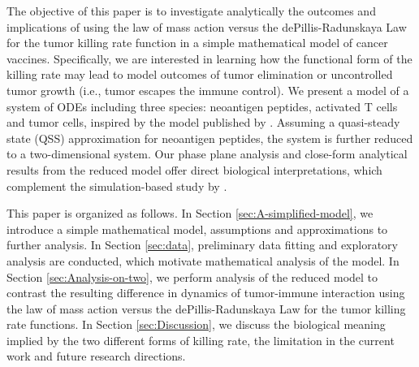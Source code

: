 \documentclass[review,authoryear]{elsarticle}
\begin{document}
The objective of this paper is to investigate analytically the outcomes
and implications of using the law of mass action versus the dePillis-Radunskaya
Law for the tumor killing rate function in a simple mathematical
model of cancer vaccines. Specifically, we are interested in learning
how the functional form of the killing rate may lead to model outcomes of tumor elimination
or uncontrolled tumor growth (i.e., tumor escapes the immune control). We present
a model of a system of ODEs including three species: neoantigen peptides, activated T cells and tumor cells, inspired by the model published by \citet{Messan2021}. Assuming a quasi-steady state (QSS) approximation for neoantigen peptides, the system is further reduced to a two-dimensional system. Our phase plane analysis and close-form analytical
results from the reduced model offer direct biological interpretations, which complement
the simulation-based study by \citet{Messan2021}.  

This paper is organized as follows. In Section \ref{sec:A-simplified-model},
we introduce a simple mathematical model, assumptions and approximations to further analysis. In Section \ref{sec:data}, preliminary data fitting and exploratory analysis are conducted, which motivate mathematical analysis of the model. In Section \ref{sec:Analysis-on-two},
we perform analysis of the reduced model to contrast the resulting
difference in dynamics of tumor-immune interaction using the law of mass action versus the dePillis-Radunskaya
Law for the tumor killing rate functions. In Section \ref{sec:Discussion}, we discuss the biological
meaning implied by the two different forms  of killing rate, the
limitation in the current work and future research directions. 
\end{document}
